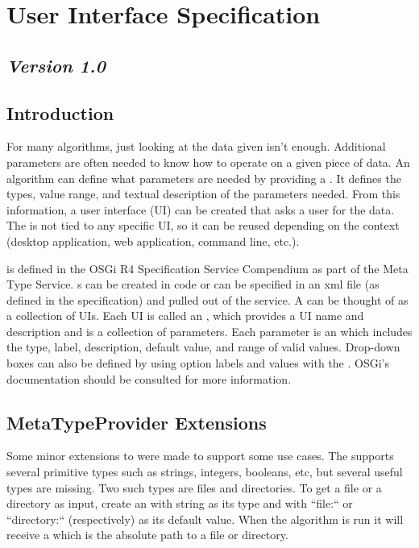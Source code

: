 \section{User Interface Specification}
\label{GUISpec}
\subsection*{\textit{Version 1.0}}
\subsection{Introduction}

For many algorithms, just looking at the data given isn't enough. Additional
parameters are often needed to know how to operate on a given piece of data. An
algorithm can define what parameters are needed by providing a
. It defines the types, value range, and textual
description of the parameters needed. From this information, a user interface
(UI) can be created that asks a user for the data. The 
is not tied to any specific UI, so it can be reused depending on the context
(desktop application, web application, command line, etc.).

 is defined in the OSGi R4 Specification Service
Compendium as part of the Meta Type Service. s can be
created in code or can be specified in an xml file (as defined in the
specification) and pulled out of the  service. A
 can be thought of as a collection of UIs. Each UI is
called an , which provides a UI name and
description and is a collection of parameters. Each parameter is an
 which includes the type, label, description, default
value, and range of valid values. Drop-down boxes can also be defined by using
option labels and values with the . OSGi's
documentation should be consulted for more information.

\subsection{MetaTypeProvider Extensions}

Some minor extensions to  were made to support some
use cases. The  supports several primitive types such as
strings, integers, booleans, etc, but several useful types are missing. Two
such types are files and directories. To get a file or a directory as input,
create an  with string as its type and with ``file:``
or ``directory:`` (respectively) as its default value. When the algorithm is
run it will receive a  which is the absolute path to a file or
directory.
